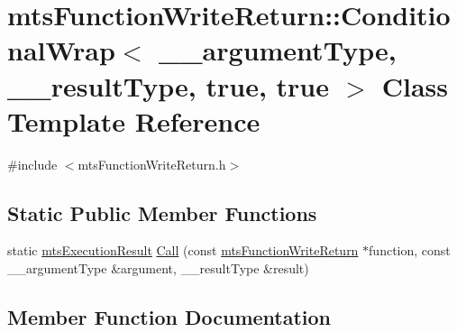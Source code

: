 \hypertarget{classmts_function_write_return_1_1_conditional_wrap_3_01____argument_type_00_01____result_type_00_01true_00_01true_01_4}{}\section{mts\+Function\+Write\+Return\+:\+:Conditional\+Wrap$<$ \+\_\+\+\_\+argument\+Type, \+\_\+\+\_\+result\+Type, true, true $>$ Class Template Reference}
\label{classmts_function_write_return_1_1_conditional_wrap_3_01____argument_type_00_01____result_type_00_01true_00_01true_01_4}


{\ttfamily \#include $<$mts\+Function\+Write\+Return.\+h$>$}

\subsection*{Static Public Member Functions}
\begin{DoxyCompactItemize}
\item 
static \hyperlink{classmts_execution_result}{mts\+Execution\+Result} \hyperlink{classmts_function_write_return_1_1_conditional_wrap_3_01____argument_type_00_01____result_type_00_01true_00_01true_01_4_a3128694605b92bc7233ae5b77e8de90c}{Call} (const \hyperlink{classmts_function_write_return}{mts\+Function\+Write\+Return} $\ast$function, const \+\_\+\+\_\+argument\+Type \&argument, \+\_\+\+\_\+result\+Type \&result)
\end{DoxyCompactItemize}


\subsection{Member Function Documentation}
\hypertarget{classmts_function_write_return_1_1_conditional_wrap_3_01____argument_type_00_01____result_type_00_01true_00_01true_01_4_a3128694605b92bc7233ae5b77e8de90c}{}
